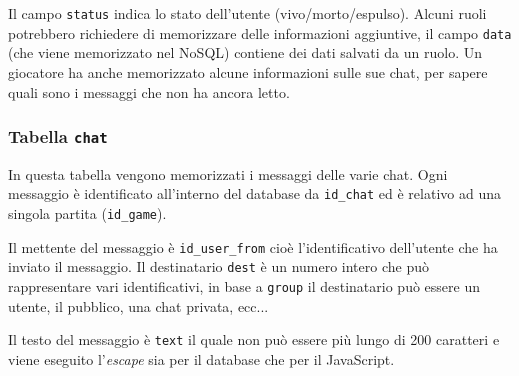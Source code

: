 Il campo \texttt{status} indica lo stato dell'utente (vivo/morto/espulso). Alcuni ruoli potrebbero richiedere di memorizzare delle informazioni aggiuntive, il campo \texttt{data} (che viene memorizzato nel NoSQL) contiene dei dati salvati da un ruolo. Un giocatore ha anche memorizzato alcune informazioni sulle sue chat, per sapere quali sono i messaggi che non ha ancora letto.



\subsubsection{Tabella \texttt{chat}}

In questa tabella vengono memorizzati i messaggi delle varie chat. Ogni messaggio è identificato all'interno del database da \texttt{id\_chat} ed è relativo ad una singola partita (\texttt{id\_game}).

Il mettente del messaggio è \texttt{id\_user\_from} cioè l'identificativo dell'utente che ha inviato il messaggio. Il destinatario \texttt{dest} è un numero intero che può rappresentare vari identificativi, in base a \texttt{group} il destinatario può essere un utente, il pubblico, una chat privata, ecc...

Il testo del messaggio è \texttt{text} il quale non può essere più lungo di 200 caratteri e viene eseguito l'\emph{escape} sia per il database che per il JavaScript.



